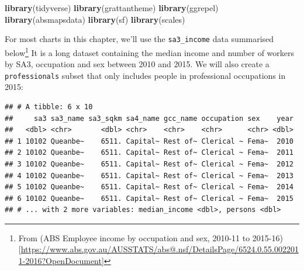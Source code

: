\documentclass[]{book}
\newenvironment{Shaded}{\begin{snugshade}}{\end{snugshade}}
\newcommand{\CommentTok}[1]{\textcolor[rgb]{0.56,0.35,0.01}{\textit{#1}}}
\newcommand{\DecValTok}[1]{\textcolor[rgb]{0.00,0.00,0.81}{#1}}
\newcommand{\KeywordTok}[1]{\textcolor[rgb]{0.13,0.29,0.53}{\textbf{#1}}}
\newcommand{\NormalTok}[1]{#1}
\newcommand{\OperatorTok}[1]{\textcolor[rgb]{0.81,0.36,0.00}{\textbf{#1}}}
\newcommand{\StringTok}[1]{\textcolor[rgb]{0.31,0.60,0.02}{#1}}
\let\rmarkdownfootnote\footnote%
\def\footnote{\protect\rmarkdownfootnote}
\begin{document}
\begin{Shaded}
\begin{Highlighting}[]
\KeywordTok{library}\NormalTok{(tidyverse)}
\KeywordTok{library}\NormalTok{(grattantheme)}
\KeywordTok{library}\NormalTok{(ggrepel)}
\KeywordTok{library}\NormalTok{(absmapsdata)}
\KeywordTok{library}\NormalTok{(sf)}
\KeywordTok{library}\NormalTok{(scales)}
\end{Highlighting}
\end{Shaded}

For most charts in this chapter, we'll use the \texttt{sa3\_income} data summarised below\footnote{From (ABS Employee income by occupation and sex, 2010-11 to 2015-16){[}\url{https://www.abs.gov.au/AUSSTATS/abs@.nsf/DetailsPage/6524.0.55.0022011-2016?OpenDocument}{]}} It is a long dataset containing the median income and number of workers by SA3, occupation and sex between 2010 and 2015. We will also create a \texttt{professionals} subset that only includes people in professional occupations in 2015:

\begin{Shaded}
\end{Shaded}

\begin{verbatim}
## # A tibble: 6 x 10
##     sa3 sa3_name sa3_sqkm sa4_name gcc_name occupation sex    year
##   <dbl> <chr>       <dbl> <chr>    <chr>    <chr>      <chr> <dbl>
## 1 10102 Queanbe~    6511. Capital~ Rest of~ Clerical ~ Fema~  2010
## 2 10102 Queanbe~    6511. Capital~ Rest of~ Clerical ~ Fema~  2011
## 3 10102 Queanbe~    6511. Capital~ Rest of~ Clerical ~ Fema~  2012
## 4 10102 Queanbe~    6511. Capital~ Rest of~ Clerical ~ Fema~  2013
## 5 10102 Queanbe~    6511. Capital~ Rest of~ Clerical ~ Fema~  2014
## 6 10102 Queanbe~    6511. Capital~ Rest of~ Clerical ~ Fema~  2015
## # ... with 2 more variables: median_income <dbl>, persons <dbl>
\end{verbatim}
\end{document}
